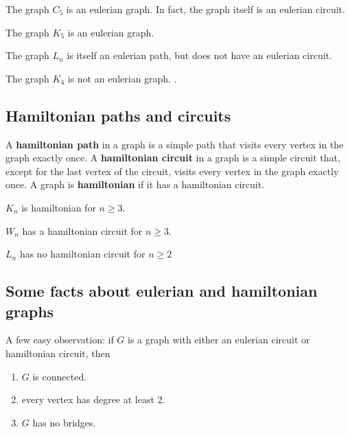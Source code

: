 \begin{exmp}
 The graph $C_5$ is an eulerian graph. In fact, the graph itself is an eulerian circuit. 
\end{exmp}


\begin{exmp}
 The graph $K_5$ is an eulerian graph. 
\end{exmp}

\begin{exmp}
 The graph $L_n$ is itself an eulerian path, but does not have an eulerian circuit.
\end{exmp}

\begin{exmp}
 The graph $K_4$ is not an eulerian graph. .
\end{exmp}

\subsection{Hamiltonian paths and circuits}

A {\bfseries {hamiltonian path}} in a graph is a simple path that visits every vertex in the graph exactly once.
A {\bfseries {hamiltonian circuit}} in a graph is a simple circuit that, except for the last vertex of the circuit, visits every vertex in the graph exactly once.
A graph is {\bfseries hamiltonian} if it has a hamiltonian circuit.

\begin{exmp}
 $K_n$ is hamiltonian for $n\geq 3$.
\end{exmp} 

\begin{exmp}
 $W_n$ has a hamiltonian circuit for $n\geq 3$.
\end{exmp} 

\begin{exmp}
 $L_n$ has no hamiltonian circuit for $n\geq 2$
\end{exmp} 

\subsection{Some facts about eulerian and hamiltonian graphs}

A few easy observation: if $G$ is a graph with either an eulerian circuit  or hamiltonian
circuit, then
\begin{enumerate}
 \item $G$ is connected.
 
 \item every vertex has degree at least 2.
 
 \item $G$ has no bridges.
 
 \end{enumerate}
 
